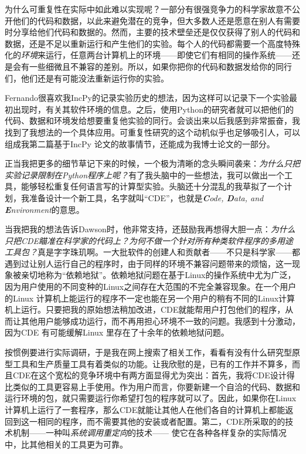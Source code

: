 \documentclass[letter,12pt]{book}
\begin{document}
\begin{CJK}{UTF8}{gbsn}
为什么可重复性在实际中如此难以实现呢？一部分有很强竞争力的科学家故意不公开他们的代码和数据，以此来避免潜在的竞争，但大多数人还是愿意在别人有需要时分享给他们代码和数据的。然而，主要的技术壁垒还是仅仅获得了别人的代码和数据，还是不足以重新运行和产生他们的实验。每个人的代码都需要一个高度特殊化的\emph{环境}来运行，任意两台计算机上的环境——即使它们有相同的操作系统——还是会有一些细微且不兼容的差别。所以，如果你把你的代码和数据发给你的同行们，他们还是有可能没法重新运行你的实验。

Fernando很喜欢我IncPy的记录实验历史的想法，因为这样可以记录下一个实验最初出现时，有关其软件环境的信息。之后，使用Python的研究者就可以把他们的代码、数据和环境发给想要重复他实验的同行。会谈出来以后我感到非常振奋，我找到了我想法的一个具体应用。可重复性研究的这个动机似乎也足够吸引人，可以组成我第二篇基于IncPy 论文的故事情节，还能成为我博士论文的一部分。

正当我把更多的细节草记下来的时候，一个极为清晰的念头瞬间袭来：\emph{为什么只把实验记录限制在Python程序上呢？}有了我头脑中的一些想法，我可以做出一个工具，能够轻松重复任何语言写的计算型实验。头脑还十分混乱的我草拟了一个计划，我准备设计一个新工具，名字就叫“CDE”，也就是\emph{\textbf{C}ode, \textbf{D}ata, and \textbf{E}nvironment}的意思。

\breakline

当我把我的想法告诉Dawson时，他非常支持，还鼓励我再想得大胆一点：\emph{为什么只把CDE瞄准在科学家的代码上？为何不做一个针对所有种类软件程序的多用途工具包？}真是字字珠玑啊。一大批软件的创建人和贡献者——不只是科学家——都遇到过让别人运行自己的程序时，由于同样的环境不兼容问题带来的烦恼，这一现象被亲切地称为“依赖地狱”。依赖地狱问题在基于Linux的操作系统中尤为广泛，因为用户使用的不同变种的Linux之间存在大范围的不完全兼容现象。在一个用户的Linux 计算机上能运行的程序不一定也能在另一个用户的稍有不同的Linux计算机上运行。只要把我的原始想法稍加改进，CDE就能帮用户打包他们的程序，从而让其他用户能够成功运行，而不再用担心环境不一致的问题。我感到十分激动，因为CDE 有可能缓解Linux 里存在了十余年的依赖地狱问题。

按惯例要进行实际调研，于是我在网上搜索了相关工作，看看有没有什么研究型原型工具和生产质量工具有着类似的功能。让我欣慰的是，已有的工作并不算多，而且CDE在这个宽松的竞争环境中有两方面显得尤为突出：首先，我将CDE设计得比类似的工具更容易上手使用。作为用户而言，你要新建一个自洽的代码、数据和运行环境的包，就只需要运行你希望打包的程序就可以了。因此，如果你在Linux计算机上运行了一套程序，那么CDE就能让其他人在他们各自的计算机上都能返回到这一相同的程序，而不需要其他的安装或者配置。第二，CDE所采取的的技术机制——一种叫\emph{系统调用重定向}的技术—— 使它在各种各样复杂的实际情况中，比其他相关的工具更为可靠。


\end{CJK}
\end{document}
